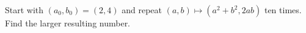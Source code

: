 Start with $(a_0,b_0)=(2,4)$ and repeat $(a,b)\mapsto(a^2+b^2,2ab)$ ten times. Find the larger resulting number.
